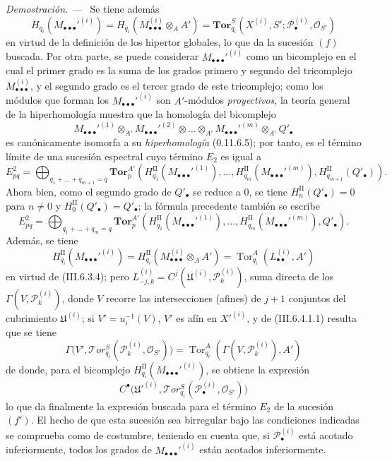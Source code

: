 \documentclass[10pt,oneside]{book}
\newcommand{\sref}[2][]{\textup{(#2)}}
\newcommand{\oldpage}[2][]{\setcounter{footnote}{0}\marginpar{\scriptsize\textbf{#1}~|~#2}\ignorespaces}
\newenvironment{proof}{\par\medskip\noindent\textit{Demostración. ---\ }}{\par}
\begin{document}
\begin{proof}
\oldpage[III]{168}
Se tiene además
\[
  H_{q_i}(M_{\bullet\bullet\bullet}'^{(i)})
  =H_{q_i}(M_{\bullet\bullet\bullet}^{(i)}\otimes_A A')
  =\mathbf{Tor}_{q_i}^S
  (X^{(i)},S';\mathscr P_\bullet^{(i)},\mathscr O_{S'})
\]
en virtud de la definición de los hipertor globales, lo que da la sucesión
$(f)$ buscada. Por otra parte, se puede considerar
$M_{\bullet\bullet\bullet}'^{(i)}$ como un bicomplejo en el cual el primer
grado es la suma de los grados primero y segundo del tricomplejo
$M_{\bullet\bullet\bullet}^{(i)}$, y el segundo grado es el tercer grado de
este tricomplejo; como los módulos que forman los
$M_{\bullet\bullet\bullet}'^{(i)}$ son $A'$-módulos \emph{proyectivos}, la teoría
general de la hiperhomología muestra que la homología del bicomplejo
\[
  M_{\bullet\bullet\bullet}'^{(1)}\otimes_{A'}
  M_{\bullet\bullet\bullet}'^{(2)}\otimes\ldots\otimes_{A'}
  M_{\bullet\bullet\bullet}'^{(m)}\otimes_{A'} Q'_\bullet
\]
es canónicamente isomorfa a su \emph{hiperhomología} \sref[0]{0.11.6.5}; por tanto,
es el término límite de una sucesión espectral cuyo término $E_2$ es igual a
\[
  E_{pq}^2
  =\bigoplus_{q_1+\ldots+q_{m+1}=q}
  \mathbf{Tor}_p^{A'}
  (H_{q_1}^{\mathrm{II}}(M_{\bullet\bullet\bullet}'^{(1)}),\ldots,
   H_{q_m}^{\mathrm{II}}(M_{\bullet\bullet\bullet}'^{(m)}),
   H_{q_{m+1}}^{\mathrm{II}}(Q'_\bullet)).
\]
Ahora bien, como el segundo grado de $Q'_\bullet$ se reduce a $0$, se tiene
$H_n^{\mathrm{II}}(Q'_\bullet)=0$ para $n\ne0$ y
$H_0^{\mathrm{II}}(Q'_\bullet)=Q'_\bullet$; la fórmula precedente también
se escribe
\[
  E_{pq}^2
  =\bigoplus_{q_1+\ldots+q_m=q}
  \mathbf{Tor}_p^{A'}
  (H_{q_1}^{\mathrm{II}}(M_{\bullet\bullet\bullet}'^{(1)}),\ldots,
   H_{q_m}^{\mathrm{II}}(M_{\bullet\bullet\bullet}'^{(m)}),Q'_\bullet).
\]
Además, se tiene
\[
  H_{q_i}^{\mathrm{II}}(M_{\bullet\bullet\bullet}'^{(i)})
  =H_{q_i}^{\mathrm{II}}(M_{\bullet\bullet\bullet}^{(i)}\otimes_A A')
  =\operatorname{Tor}_{q_i}^A(L_{\bullet\bullet}^{(i)},A')
\]
en virtud de \sref{III.6.3.4}; pero
$L_{-j,k}^{(i)}=C^j(\mathfrak U^{(i)},\mathscr P_k^{(i)})$, suma directa de
los $\Gamma(V,\mathscr P_k^{(i)})$, donde $V$ recorre las intersecciones
(afines) de $j+1$ conjuntos del cubrimiento $\mathfrak U^{(i)}$; si
$V'=u_i^{-1}(V)$, $V'$ es afín en $X'^{(i)}$, y de
\sref{III.6.4.1.1} resulta que se tiene
\[
  \Gamma\bigl(V',\mathscr{T}\!or_{q_i}^S
  (\mathscr P_k^{(i)},\mathscr O_{S'})\bigr)
  =\operatorname{Tor}_{q_i}^A(\Gamma(V,\mathscr P_k^{(i)}),A')
\]
de donde, para el bicomplejo
$H_{q_i}^{\mathrm{II}}(M_{\bullet\bullet\bullet}'^{(i)})$, se obtiene la
expresión
\[
  C^\bullet\bigl(\mathfrak U'^{(i)},
  \mathscr{T}\!or_{q_i}^S(\mathscr P_\bullet^{(i)},\mathscr O_{S'})\bigr)
\]
lo que da finalmente la expresión buscada para el término $E_2$ de la
sucesión $(f')$. El hecho de que esta sucesión sea birregular bajo las
condiciones indicadas se comprueba como de costumbre, teniendo en cuenta que,
si $\mathscr P_\bullet^{(i)}$ está acotado inferiormente, todos los grados de
$M_{\bullet\bullet\bullet}'^{(i)}$ están acotados inferiormente.
\end{proof}
\end{document}
